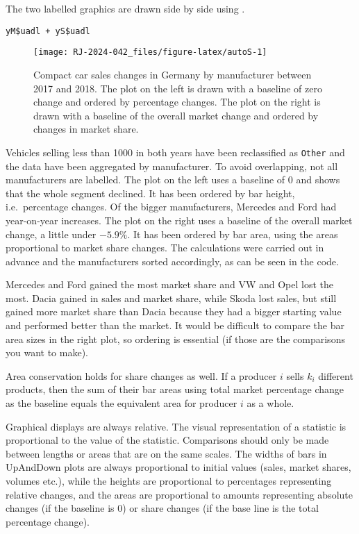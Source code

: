 The two labelled graphics are drawn side by side using .

\texttt{yM\$uadl\ +\ yS\$uadl}

\begin{figure}

{\centering \texttt{[image: RJ-2024-042\_files/figure-latex/autoS-1]} 

}

\caption{Compact car sales changes in Germany by manufacturer between 2017 and 2018.  The plot on the left is drawn with a baseline of zero change and ordered by percentage changes.  The plot on the right is drawn with a baseline of the overall market change and ordered by changes in market share.}\label{fig:autoS}
\end{figure}

Vehicles selling less than 1000 in both years have been reclassified as \texttt{Other} and the data have been aggregated by manufacturer. To avoid overlapping, not all manufacturers are labelled. The plot on the left uses a baseline of 0 and shows that the whole segment declined. It has been ordered by bar height, i.e.~percentage changes. Of the bigger manufacturers, Mercedes and Ford had year-on-year increases. The plot on the right uses a baseline of the overall market change, a little under \(-5.9\%\). It has been ordered by bar area, using the areas proportional to market share changes. The calculations were carried out in advance and the manufacturers sorted accordingly, as can be seen in the code.

Mercedes and Ford gained the most market share and VW and Opel lost the most. Dacia gained in sales and market share, while Skoda lost sales, but still gained more market share than Dacia because they had a bigger starting value and performed better than the market. It would be difficult to compare the bar area sizes in the right plot, so ordering is essential (if those are the comparisons you want to make).

Area conservation holds for share changes as well. If a producer \(i\) sells \(k_i\) different products, then the sum of their bar areas using total market percentage change as the baseline equals the equivalent area for producer \(i\) as a whole.

Graphical displays are always relative. The visual representation of a statistic is proportional to the value of the statistic. Comparisons should only be made between lengths or areas that are on the same scales. The widths of bars in UpAndDown plots are always proportional to initial values (sales, market shares, volumes etc.), while the heights are proportional to percentages representing relative changes, and the areas are proportional to amounts representing absolute changes (if the baseline is \(0\)) or share changes (if the base line is the total percentage change).

